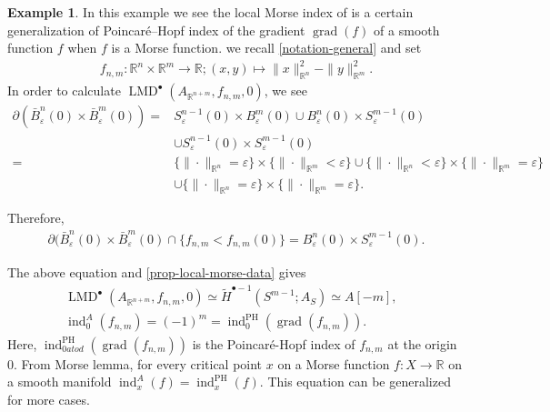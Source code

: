 \documentclass[a4paper,dvipdfmx,reqno,12pt]{amsart}
\theoremstyle{definition}
\newtheorem{example}[theorem]{Example}
\newcommand{\opn}[1]{\operatorname{#1}}
\numberwithin{equation}{section}
\begin{document}
\begin{example}
\label{example-morse-index}
In this example we see
the local Morse index of is a certain generalization of 
Poincar\'e--Hopf index of the gradient 
$\opn{grad}(f)$ of a smooth function $f$ 
when $f$ is a Morse function. 
we recall \cref{notation-general}
and set
\begin{align}
f_{n,m}\colon \mathbb{R}^{n}\times \mathbb{R}^{m}\to \mathbb{R};
(x,y)\mapsto \|x\|_{\mathbb{R}^{n}}^2
-\|y\|_{\mathbb{R}^{m}}^2.
\end{align}
In order to calculate 
$\opn{LMD}^{\bullet}(A_{\mathbb{R}^{n+m}},f_{n,m},0)$, we 
see
\begin{align}
\partial (\bar{B}^{n}_{\varepsilon}(0)
\times \bar{B}^{m}_{\varepsilon}(0))=
& S^{n-1}_{\varepsilon}(0)\times B^{m}_{\varepsilon}(0) 
\cup B^{n}_{\varepsilon}(0)\times S^{m-1}_{\varepsilon}(0) \\
& \cup 
S^{n-1}_{\varepsilon}(0)\times S^{m-1}_{\varepsilon}(0) \\
=& \{\|\cdot\|_{\mathbb{R}^{n}}=\varepsilon\} 
\times \{\|\cdot\|_{\mathbb{R}^{m}} < \varepsilon\} 
\cup \{\|\cdot\|_{\mathbb{R}^{n}} < \varepsilon\} \times 
\{\|\cdot\|_{\mathbb{R}^{m}}= \varepsilon\} \\
& \cup 
\{\|\cdot\|_{\mathbb{R}^{n}}=\varepsilon\} \times 
\{\|\cdot\|_{\mathbb{R}^{m}}= \varepsilon\}.
\end{align}

Therefore,  
\begin{align}
\partial (\bar{B}^{n}_{\varepsilon}(0)
\times \bar{B}^{m}_{\varepsilon}(0)\cap 
\{f_{n,m}<f_{n,m}(0)\}
= B^{n}_{\varepsilon}(0)\times S^{m-1}_{\varepsilon}(0).
\end{align}

The above equation and \cref{prop-local-morse-data} 
gives
\begin{align}
\opn{LMD}^{\bullet}(A_{\mathbb{R}^{n+m}},f_{n,m},0)\simeq 
\tilde{H}^{\bullet-1}(S^{m-1};A_S) \simeq A[-m],& \\
\opn{ind}^{A}_{0}(f_{n,m})=(-1)^{m}=
\opn{ind}^{\opn{PH}}_{0}(\opn{grad}(f_{n,m})).&
\end{align}
Here, $\opn{ind}^{\opn{PH}}_{0atod}(\opn{grad}(f_{n,m}))$ is 
the Poincar\'e-Hopf index of $f_{n,m}$ at 
the origin $0$.
From Morse lemma,
for every critical point $x$ on a Morse function 
$f\colon X\to \mathbb{R}$ on a smooth manifold 
$\opn{ind}_x^{A}(f)=\opn{ind}^{\opn{PH}}_x(f)$. 
This equation can be generalized for more cases.
\end{example}
\end{document}
